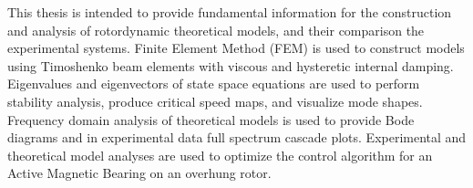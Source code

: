 This thesis is intended to provide fundamental information for the construction and analysis of rotordynamic theoretical models, and their comparison the experimental systems. Finite Element Method (FEM) is used to construct models using Timoshenko beam elements with viscous and hysteretic internal damping. Eigenvalues and eigenvectors of state space equations are used to perform stability analysis, produce critical speed maps, and visualize mode shapes. Frequency domain analysis of theoretical models is used to provide Bode diagrams and in experimental data full spectrum cascade plots. Experimental and theoretical model analyses are used to optimize the control algorithm for an Active Magnetic Bearing on an overhung rotor.